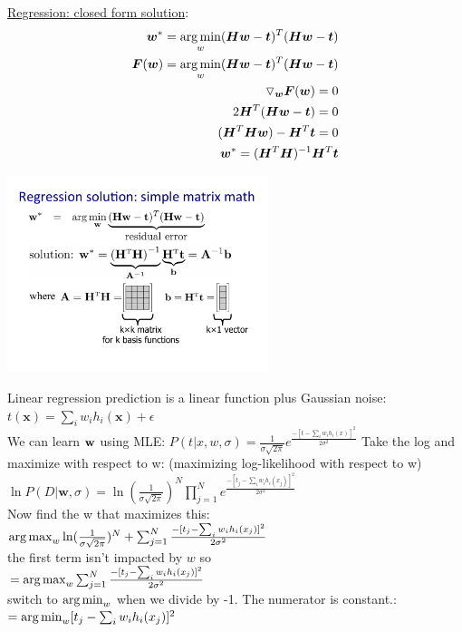 \underline{Regression: closed form solution}:  %
\begin{align*}
	\bm{w}^* = \operatorname*{arg\,min}_w (\bm{Hw} -\bm{t})^T (\bm{Hw} -\bm{t})  & \\
	\bm{F}(\bm{w}) =  \operatorname*{arg\,min}_w (\bm{Hw} -\bm{t})^T (\bm{Hw} -\bm{t}) & \\
	\triangledown_{\bm{w}}\bm{F}(\bm{w}) = 0 \\
	2 \bm{H}^T (\bm{H}\bm{w}-\bm{t}) = 0  & \\
	(\bm{H}^T\bm{H}\bm{w}) - \bm{H}^T\bm{t} = 0 & \\
	\bm{w}^* = (\bm{H}^T\bm{H})^{-1}\bm{H}^T\bm{t} &
\end{align*}

\includegraphics[width=3in]{figures/Regression_matrix_math.pdf}

Linear regression prediction is a linear function plus Gaussian noise:  \hfill \\
$t(\bm{x}) = \sum_i w_i h_i(\bm{x}) + \epsilon $ \hfill \\
We can learn $\bf{w}$ using MLE: 
$P(t | x, w, \sigma) = \frac{1}{\sigma \sqrt{2 \pi}} e^\frac{-[t - \sum_i w_i h_i(x)]^2}{2 \sigma^2}$
Take the log and maximize with respect to w:  (maximizing log-likelihood with respect to w) \hfill \\
$\displaystyle \ln P(D | \bm{w}, \sigma) = \ln(\frac{1}{\sigma \sqrt{2 \pi}})^N \prod_{j=1}^N e^\frac{-[t_j - \sum_i w_i h_i(x_j)]^2}{2 \sigma^2}$ \hfill \\
Now find the w that maximizes this: \hfill \\
$\operatorname*{arg\,max}_w \ln(\frac{1}{\sigma \sqrt{2 \pi}})^N + \sum_{j=1}^N \frac{-[t_j - \sum_i w_i h_i(x_j)]^2}{2 \sigma^2}$ \hfill \\
the first term isn't impacted by $w$ so  \hfill \\
$= \operatorname*{arg\,max}_w  \sum_{j=1}^N \frac{-[t_j - \sum_i w_i h_i(x_j)]^2}{2 \sigma^2}$ \hfill \\
switch to $\operatorname*{arg\,min}_w$ when we divide by -1.  The numerator is constant.:  \hfill \\
$= \operatorname*{arg\,min}_w  [t_j - \sum_i w_i h_i(x_j)]^2 $ \hfill \\

